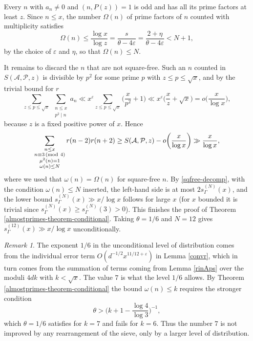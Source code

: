 \documentclass[12pt]{amsart}
\theoremstyle{remark}
\newtheorem{remark}{Remark}
\renewcommand{\pmod}[1]{\mkern3mu(\mathrm{mod}\ #1)}
\begin{document}
Every $n$ with $a_n \ne 0$ and $(n, P(z)) = 1$ is odd and has all its prime factors at least $z$. Since $n \le x$, the number $\Omega(n)$ of prime factors of $n$ counted with multiplicity satisfies
\[
    \Omega(n) \le \frac{\log x}{\log z} = \frac{s}{\theta - 4\varepsilon} = \frac{2+\eta}{\theta - 4\varepsilon}< N+1,
\]
by the choice of $\varepsilon$ and $\eta$, so that $\Omega(n)\le N$.

It remains to discard the $n$ that are not square-free. Such an $n$ counted in $S(\mathcal A,\mathcal P,z)$ is divisible by $p^2$ for some prime $p$ with $z\le p\le\sqrt x$, and by the trivial bound for $r$
\[
    \sum_{z \le p \le \sqrt x}\ \sum_{\substack{n \le x\\ p^2 \mid n}}a_n\ll x^{\varepsilon} \sum_{z \le p  \le \sqrt{x} }\biggl(\frac{x}{p^2}+1\biggr)\ll x^{\varepsilon}\biggl(\frac xz+\sqrt x\biggr) = o\biggl(\frac{x}{\log x}\biggr),
\]
because $z$ is a fixed positive power of $x$. Hence
\[
    \sum_{\substack{n\le x \\ n \equiv 3 \pmod 4\\ \mu^2(n) = 1 \\ \omega(n) \le N}} r(n-2)r(n+2) \ge S(\mathcal A,\mathcal P,z)-o\biggl(\frac x{\log x}\biggr) \gg \frac{x}{\log x},
\]
where we used that $\omega(n) = \Omega(n)$ for square-free $n$. By \eqref{sqfree-decomp}, with the condition $\omega(n) \le N$ inserted, the left-hand side is at most $2s_{\Gamma}^{(N)}(x)$, and the lower bound $s_{\Gamma}^{(N)}(x) \gg x/\log x$ follows for large $x$ (for $x$ bounded it is trivial since $s_{\Gamma}^{(N)}(x)\ge s_{\Gamma}^{(N)}(3) > 0$). 
This finishes the proof of Theorem \ref{almostprimes-theorem-conditional}. Taking $\theta = 1/6$ and $N = 12$ gives $s_{\Gamma}^{(12)}(x)\gg x/\log x$ unconditionally.

\begin{remark}
   The exponent $1/6$ in the unconditional level of distribution comes from the individual error term $O(d^{-1/2}x^{11/12+\varepsilon})$ in Lemma \ref{convr}, which in turn comes from the summation of terms coming from Lemma \ref{rinAps} over the moduli $4dk$ with $k< \sqrt x$. The value $7$ is what the level $1/6$ allows. By Theorem \ref{almostprimes-theorem-conditional} the bound $\omega(n) \le k$ requires the stronger condition
    \[
        \theta > \biggl(k+1-\frac{\log 4}{\log 3}\biggr)^{-1},
    \]
    which $\theta = 1/6$ satisfies for $k = 7$ and fails for $k = 6$. Thus the number $7$ is not improved by any rearrangement of the sieve, only by a larger level of distribution.
\end{remark}
\end{document}
